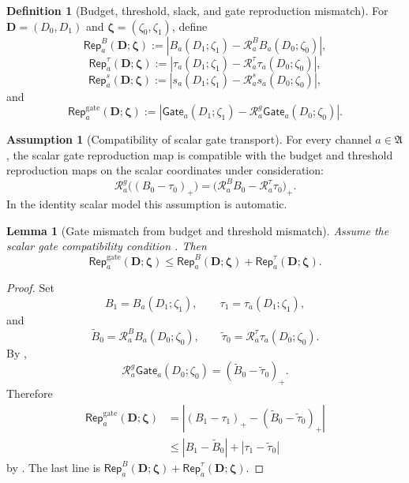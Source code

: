 \documentclass[11pt]{article}
\numberwithin{equation}{section}
\newtheorem{lemma}[lemma]{Lemma}
\theoremstyle{definition}
\newtheorem{definition}[definition]{Definition}
\newtheorem{assumption}[assumption]{Assumption}
\theoremstyle{remark}
\newcommand{\Rep}{\mathsf{Rep}}
\newcommand{\Gate}{\mathsf{Gate}}
\newcommand{\calR}{\mathcal R}
\newcommand{\bD}{\mathbf D}
\newcommand{\bzeta}{\boldsymbol\zeta}
\newcommand{\Achan}{\mathfrak A}
\begin{document}
\begin{definition}[Budget, threshold, slack, and gate reproduction mismatch]
\label{gs:def:chain-gs-mismatch}
For \(\bD=(D_0,D_1)\) and \(\bzeta=(\zeta_0,\zeta_1)\), define
\[
    \Rep_a^B(\bD;\bzeta)
    :=
    |B_a(D_1;\zeta_1)-\calR_a^B B_a(D_0;\zeta_0)|,
\]
\[
    \Rep_a^\tau(\bD;\bzeta)
    :=
    |\tau_a(D_1;\zeta_1)-\calR_a^\tau \tau_a(D_0;\zeta_0)|,
\]
\[
    \Rep_a^s(\bD;\bzeta)
    :=
    |s_a(D_1;\zeta_1)-\calR_a^s s_a(D_0;\zeta_0)|,
\]
and
\[
    \Rep_a^{\mathrm{gate}}(\bD;\bzeta)
    :=
    |\Gate_a(D_1;\zeta_1)-\calR_a^g\Gate_a(D_0;\zeta_0)|.
\]
\end{definition}

\begin{assumption}[Compatibility of scalar gate transport]
\label{gs:ass:scalar-gate-compatibility}
For every channel \(a\in\Achan\), the scalar gate reproduction map is
compatible with the budget and threshold reproduction maps on the scalar
coordinates under consideration:
\[
    \calR_a^g\bigl((B_0-\tau_0)_+\bigr)
    =
    \bigl(\calR_a^B B_0-\calR_a^\tau\tau_0\bigr)_+.
\]
In the identity scalar model this assumption is automatic.
\end{assumption}

\begin{lemma}[Gate mismatch from budget and threshold mismatch]
\label{gs:lem:gate-mismatch-target}
Assume the scalar gate compatibility condition
.  Then
\[
    \Rep_a^{\mathrm{gate}}(\bD;\bzeta)
    \le
    \Rep_a^B(\bD;\bzeta)+\Rep_a^\tau(\bD;\bzeta).
\]
\end{lemma}

\begin{proof}
Set
\[
    B_1=B_a(D_1;\zeta_1),\qquad
    \tau_1=\tau_a(D_1;\zeta_1),
\]
and
\[
    \widetilde B_0=\calR_a^B B_a(D_0;\zeta_0),\qquad
    \widetilde\tau_0=\calR_a^\tau\tau_a(D_0;\zeta_0).
\]
By ,
\[
    \calR_a^g\Gate_a(D_0;\zeta_0)
    =
    (\widetilde B_0-\widetilde\tau_0)_+.
\]
Therefore
\[
\begin{aligned}
    \Rep_a^{\mathrm{gate}}(\bD;\bzeta)
    &=
    \left|
        (B_1-\tau_1)_+
        -
        (\widetilde B_0-\widetilde\tau_0)_+
    \right|\\
    &\le
    |B_1-\widetilde B_0|+|\tau_1-\widetilde\tau_0|
\end{aligned}
\]
by .  The last line is
\(\Rep_a^B(\bD;\bzeta)+\Rep_a^\tau(\bD;\bzeta)\).
\end{proof}
\end{document}
